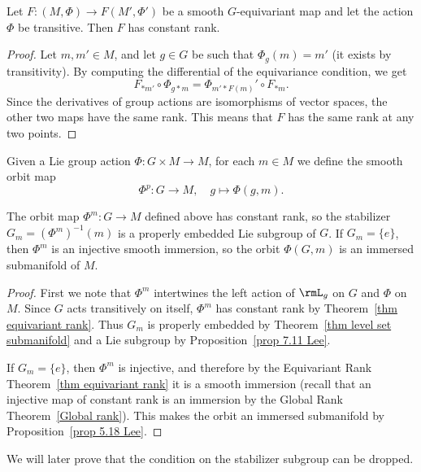 \begin{thm}\label{thm equivariant rank}
    Let $F:(M,\Phi)\to F(M',\Phi')$ be a smooth $G$-equivariant map and let the action $\Phi$ be transitive. Then $F$ has constant rank.
\end{thm}
\begin{proof}
    Let $m,m'\in M$, and let $g\in G$ be such that $\Phi_g(m)=m'$ (it exists by transitivity). By computing the differential of the equivariance condition, we get
    \[F_{\ast m'}\circ \Phi_{g\ast m}=\Phi_{m'\ast F(m)}'\circ F_{\ast m}.\]
    Since the derivatives of group actions are isomorphisms of vector spaces, the other two maps have the same rank. This means that $F$ has the same rank at any two points.
\end{proof}


\begin{defn}
    Given a Lie group action $\Phi:G\times M\to M$, for each $m\in M$ we define the smooth orbit map 
    \[\Phi^p:G\to M,\quad g\mapsto \Phi(g,m).\]
\end{defn}

\begin{prop}
    The orbit map $\Phi^m:G\to M$ defined above has constant rank, so the stabilizer $G_m=(\Phi^m)^{-1}(m)$ is a properly embedded Lie subgroup of $G$. If $G_m=\{e\}$, then $\Phi^m$ is an injective smooth immersion, so the orbit $\Phi(G,m)$ is an immersed submanifold of $M$.
\end{prop}
\begin{proof}
    First we note that $\Phi^m$ intertwines the left action of $\rmL_g$ on $G$ and $\Phi$ on $M$. Since $G$ acts transitively on itself, $\Phi^m$ has constant rank by Theorem~\ref{thm equivariant rank}. Thus $G_m$ is properly embedded by Theorem~\ref{thm level set submanifold} and a Lie subgroup by Proposition~\ref{prop 7.11 Lee}.

    If $G_m=\{e\}$, then $\Phi^m$ is injective, and therefore by the Equivariant Rank Theorem~\ref{thm equivariant rank} it is a smooth immersion (recall that an injective map of constant rank is an immersion by the Global Rank Theorem~\ref{Global rank}). This makes the orbit an immersed submanifold by Proposition~\ref{prop 5.18 Lee}.
\end{proof}
\begin{rem}
    We will later prove that the condition on the stabilizer subgroup can be dropped.
\end{rem}

